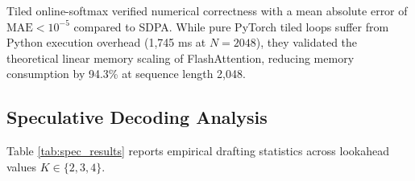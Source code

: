 \documentclass[conference]{IEEEtran}
\begin{document}
\begin{table}[htbp]
\caption{Task 4: Attention Mechanism Memory and Runtime Scaling}
\begin{center}
\label{tab:tiled_attn}
\end{center}
\end{table}

Tiled online-softmax verified numerical correctness with a mean absolute error of $\text{MAE} < 10^{-5}$ compared to SDPA. While pure PyTorch tiled loops suffer from Python execution overhead (1,745 ms at $N=2048$), they validated the theoretical linear memory scaling of FlashAttention, reducing memory consumption by 94.3\% at sequence length 2,048.

\subsection{Speculative Decoding Analysis}
Table \ref{tab:spec_results} reports empirical drafting statistics across lookahead values $K \in \{2, 3, 4\}$.

\begin{table}[htbp]
\caption{Task 5: Speculative Decoding Performance Metrics}
\begin{center}
\label{tab:spec_results}
\end{center}
\end{table}
\end{document}
